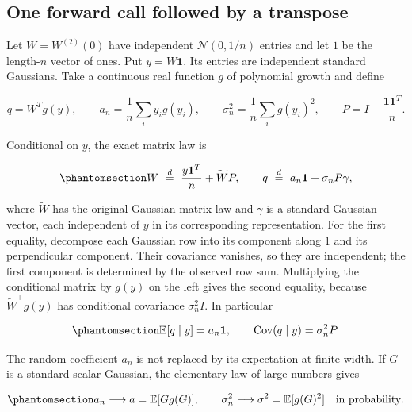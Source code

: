 \documentclass[
  11pt,
]{article}
\theoremstyle{definition}
\theoremstyle{plain}
\theoremstyle{plain}
\theoremstyle{plain}
\theoremstyle{remark}
\begin{document}
\subsection{One forward call followed by a
transpose}\label{sec-docs-gaussian-calculus-l19}

Let \(W=W^{(2)}(0)\) have independent \(\mathcal{N}(0,1/n)\) entries and
let \(1\) be the length-\(n\) vector of ones. Put \(y=W\mathbf{1}\). Its
entries are independent standard Gaussians. Take a continuous real
function \(g\) of polynomial growth and define

\[
q=W^T g(y),\qquad
a_n=\frac1n\sum_i y_i g(y_i),\qquad
\sigma_n^2=\frac1n\sum_i g(y_i)^2,\qquad
P=I-\frac{\mathbf1\mathbf1^T}{n}.
\]

Conditional on \(y\), the exact matrix law is

\begin{equation}\protect\phantomsection\label{eq-docs-gaussian-calculus-l34}{
W\ \overset{d}{=}\ \frac{y\mathbf1^T}{n}+\widetilde W P,
\qquad
q\ \overset{d}{=}\ a_n\mathbf1+\sigma_n P\gamma,
}\end{equation}

where \(\widetilde W\) has the original Gaussian matrix law and
\(\gamma\) is a standard Gaussian vector, each independent of \(y\) in
its corresponding representation. For the first equality, decompose each
Gaussian row into its component along \(1\) and its perpendicular
component. Their covariance vanishes, so they are independent; the first
component is determined by the observed row sum. Multiplying the
conditional matrix by \(g(y)\) on the left gives the second equality,
because \(\widetilde W^{\top}g(y)\) has conditional covariance
\(\sigma_n^2I\). In particular

\begin{equation}\protect\phantomsection\label{eq-docs-gaussian-calculus-l50}{
\mathbb E[q\mid y]=a_n\mathbf1,\qquad
\operatorname{Cov}(q\mid y)=\sigma_n^2P.
}\end{equation}

The random coefficient \(a_n\) is not replaced by its expectation at
finite width. If \(G\) is a standard scalar Gaussian, the elementary law
of large numbers gives

\begin{equation}\protect\phantomsection\label{eq-docs-gaussian-calculus-l60}{
a_n\longrightarrow a=\mathbb E[Gg(G)],\qquad
\sigma_n^2\longrightarrow\sigma^2=\mathbb E[g(G)^2]
\quad\text{in probability}.
}\end{equation}
\end{document}
